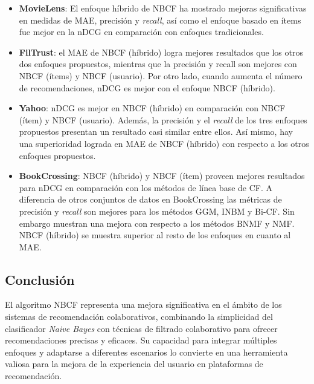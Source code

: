 \documentclass[twocolumn, fontsize=10pt]{article}
\begin{document}
\begin{itemize}
    \item \textbf{MovieLens}: El enfoque 
    híbrido de NBCF ha mostrado mejoras significativas en 
    medidas de MAE, precisión y \textit{recall}, 
    así como el enfoque basado en ítems fue mejor en la 
    nDCG en comparación con enfoques 
    tradicionales.\cite{tesis_sistema_recomendador_hibrido}
    \item \textbf{FilTrust}: el MAE de NBCF (híbrido) 
    logra mejores resultados que los otros dos enfoques 
    propuestos, mientras que la precisión y recall son 
    mejores con NBCF (ítems) y NBCF (usuario). 
    Por otro lado, cuando aumenta el número de 
    recomendaciones, nDCG es mejor con el enfoque NBCF (híbrido).\cite{tesis_sistema_recomendador_hibrido}
    \item \textbf{Yahoo}: nDCG es mejor en NBCF
    (híbrido) en comparación con NBCF (ítem) y NBCF (usuario). 
    Además, la precisión y el \textit{recall} de los 
    tres enfoques propuestos presentan un resultado 
    casi similar entre ellos. Así mismo, hay una 
    superioridad lograda en MAE de NBCF (híbrido)
    con respecto a los otros enfoques propuestos.\cite{tesis_sistema_recomendador_hibrido}
    \item \textbf{BookCrossing}: NBCF (híbrido) y NBCF (ítem)
    proveen mejores resultados para nDCG en 
    comparación con los métodos de línea base de CF. 
    A diferencia de otros conjuntos de datos en 
    BookCrossing las métricas de precisión y \textit{recall} 
    son mejores para los métodos GGM, INBM y Bi-CF. 
    Sin embargo muestran una mejora con respecto a 
    los métodos BNMF y NMF. NBCF (híbrido) se muestra 
    superior al resto de los enfoques en cuanto al MAE.\cite{tesis_sistema_recomendador_hibrido}
\end{itemize}

\subsection{Conclusión}

El algoritmo NBCF representa una mejora significativa 
en el ámbito de los sistemas de recomendación 
colaborativos, combinando la simplicidad del 
clasificador \textit{Naive Bayes} con técnicas de filtrado 
colaborativo para ofrecer recomendaciones precisas y 
eficaces. Su capacidad para integrar múltiples 
enfoques y adaptarse a diferentes escenarios lo 
convierte en una herramienta valiosa para la mejora de 
la experiencia del usuario en plataformas de 
recomendación.
\end{document}
